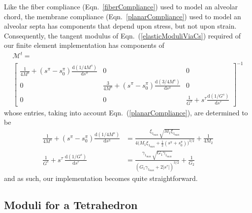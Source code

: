 Like the fiber compliance (Eqn.~\ref{fiberCompliance}) used to model an alveolar chord, the membrane compliance (Eqn.~\ref{planarCompliance}) used to model an alveolar septa has components that depend upon stress, but not upon strain.  Consequently, the tangent modulus of Eqn.~(\ref{elasticModuliViaCs}) required of our finite element implementation has components of
\small
\begin{multline}
    \boldsymbol{\mathcal{M}}^t = \\ \begin{bmatrix}
    \frac{1}{4M^s} + ( s^{\pi} - s^{\pi}_0 ) \frac{\mathrm{d} (1 / 4M^s)}
    {\mathrm{d} s^{\pi}}
    & 0 & 0 \\
    0 & \frac{3}{4M^s} + ( s^{\pi} - s^{\pi}_0 ) \frac{\mathrm{d} (3 / 4M^s)}
    {\mathrm{d} s^{\pi}} & 0 \\
    0 & 0 & \frac{1}{G^s} + s^{\tau} \frac{\mathrm{d} (1/G^s)}{\mathrm{d} s^{\tau}} 
    \end{bmatrix}^{-1}
    \label{pentagonTangentModulus}
\end{multline}
\normalsize
whose entries, taking into account Eqn.~(\ref{planarCompliance}), are determined to be
\begin{subequations}
    \begin{align}
    \frac{1}{4M^s} + ( s^{\pi} - s^{\pi}_0 ) \frac{\mathrm{d}(1/4M^s)}{\mathrm{d} s^{\pi}} & = \frac{\xi_{1_{\max}} \, \sqrt{M_1 \xi_{1_{\max}}}}
    {4 \bigl( M_1 \xi_{1_{\max}} + \frac{1}{2} ( s^{\pi} + s^{\pi}_0 ) \bigr)^{3/2}}
    + \frac{1}{4M_2} \\
    \frac{1}{G^s} + s^{\tau} \, \frac{\mathrm{d}(1/G^s)}{\mathrm{d} s^{\tau}} & = 
    \frac{\gamma_{1_{\max}} \, \sqrt{G_1 \gamma_{1_{\max}}}}
    {( G_1 \gamma_{1_{\max}} + 2 | s^{\tau} | )^{3/2}} + \frac{1}{G_2}
    \end{align}
\end{subequations}
and as such, our implementation becomes quite straightforward.

\subsection{Moduli for a Tetrahedron}

